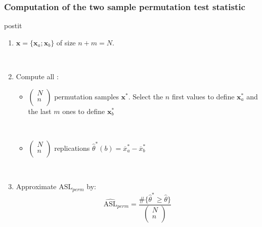 {
\frametitle{Computation of the two sample permutation test statistic}

\begin{beamercolorbox}[wd=\linewidth, rounded=true,shadow=true]{postit}

\begin{enumerate}
\item $\mathbf{x}=\lbrace \mathbf{x}_a;\mathbf{x}_b \rbrace$ of size $n+m=N$. 

\

\item Compute  all  :


\begin{itemize}
\item $
\left(
\begin{array}{l}
 N\\ 
 n \\
 \end{array}
\right)
$ permutation samples $\mathbf{x}^{*}$. Select the $n$ first values to define $\mathbf{x}^{*}_a$ and the last $m$ ones to define $\mathbf{x}^{*}_b$

\ 

\item  $
\left(
\begin{array}{l}
 N\\ 
 n \\
 \end{array}
\right)
$ replications $\hat{\theta}^{*}(b)=\overline{x}_{a}^{*}-\overline{x}_{b}^{*}$
\end{itemize}

\

\item Approximate $\mathrm{ASL}_{perm}$ by:
$$
\widehat{\mathrm{ASL}}_{perm}= \frac{\# \lbrace \hat{\theta}^{*} \geq \hat{\theta} \rbrace}{\left(
\begin{array}{l}
 N\\ 
 n \\
 \end{array}
\right)}
$$
\end{enumerate}

\end{beamercolorbox}
}
